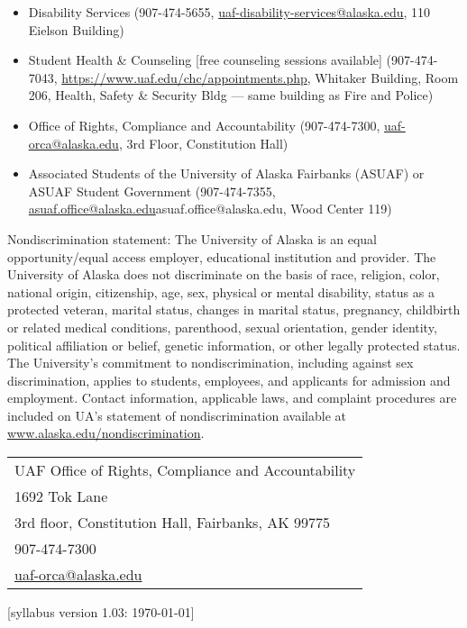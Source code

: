 \documentclass[12pt]{article}
\def\mailto#1{\href{mailto:#1}{#1}}
\begin{document}
\begin{itemize}
\setlength\itemsep{0em}
\item Disability Services (907-474-5655, \mailto{uaf-disability-services@alaska.edu}, 110 Eielson Building)
\item Student Health \& Counseling [free counseling sessions available] (907-474-7043, \url{https://www.uaf.edu/chc/appointments.php}, Whitaker Building, Room 206, Health, Safety \& Security Bldg --- same building as Fire and Police)
\item Office of Rights, Compliance and Accountability (907-474-7300, \mailto{uaf-orca@alaska.edu}, 3rd Floor, Constitution Hall)
\item Associated Students of the University of Alaska Fairbanks (ASUAF) or ASUAF Student Government (907-474-7355, \mailto{asuaf.office@alaska.edu}{asuaf.office@alaska.edu}, Wood Center 119)
\end{itemize}

Nondiscrimination statement: The University of Alaska is an equal opportunity/equal access employer, educational institution and provider. The University of Alaska does not discriminate on the basis of race, religion, color, national origin, citizenship, age, sex, physical or mental disability, status as a protected veteran, marital status, changes in marital status, pregnancy, childbirth or related medical conditions, parenthood, sexual orientation, gender identity, political affiliation or belief, genetic information, or other legally protected status. The University's commitment to nondiscrimination, including against sex discrimination, applies to students, employees, and applicants for admission and employment. Contact information, applicable laws, and complaint procedures are included on UA's statement of nondiscrimination available at \url{www.alaska.edu/nondiscrimination}.

\begin{tabular}{l}
UAF Office of Rights, Compliance and Accountability\\
1692 Tok Lane\\
3rd floor, Constitution Hall, Fairbanks, AK 99775\\
907-474-7300\\
\url{uaf-orca@alaska.edu}
\end{tabular}

\hfill  \scriptsize [syllabus version 1.03: \today] \normalsize
\end{document}
